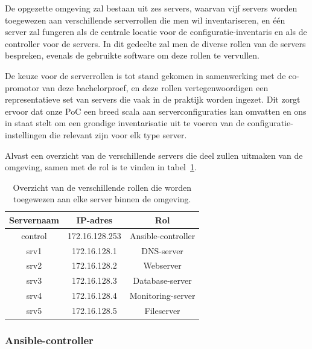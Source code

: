De opgezette omgeving zal bestaan uit zes servers, waarvan vijf servers worden toegewezen aan verschillende serverrollen die men wil inventariseren, en één server zal fungeren als de centrale locatie voor de configuratie-inventaris en als de controller voor de servers.
In dit gedeelte zal men de diverse rollen van de servers bespreken, evenals de gebruikte software om deze rollen te vervullen.

De keuze voor de serverrollen is tot stand gekomen in samenwerking met de co-promotor van deze bachelorproef, en deze rollen vertegenwoordigen een representatieve set van servers die vaak in de praktijk worden ingezet.
Dit zorgt ervoor dat onze PoC een breed scala aan serverconfiguraties kan omvatten en ons in staat stelt om een grondige inventarisatie uit te voeren van de configuratie-instellingen die relevant zijn voor elk type server.

Alvast een overzicht van de verschillende servers die deel zullen uitmaken van de omgeving, samen met de rol is te vinden in tabel~\ref{table:poc-server-roles}.

\begin{table}[!h]
    \begin{center}
        \begin{tabular}{ c c c }
            \hline
                Servernaam & IP-adres & Rol \\ [0.5ex]
            \hline
            control & 172.16.128.253 & Ansible-controller \\
            srv1    & 172.16.128.1   & DNS-server \\
            srv2    & 172.16.128.2   & Webserver \\
            srv3    & 172.16.128.3   & Database-server \\
            srv4    & 172.16.128.4   & Monitoring-server \\
            srv5    & 172.16.128.5   & Fileserver \\
        \end{tabular}
    \end{center}
    \caption[Rollen toegewezen aan servers.]{Overzicht van de verschillende rollen die worden toegewezen aan elke server binnen de omgeving.}
    \label{table:poc-server-roles}
\end{table}


\subsubsection{Ansible-controller}
\label{poc_ansible_controller}

